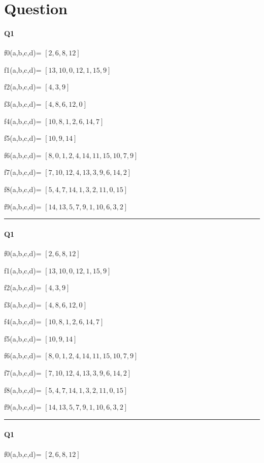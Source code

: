 
\section{Question}

\paragraph{Q1}


f0(a,b,c,d)= $[2, 6, 8, 12]$

f1(a,b,c,d)= $[13, 10, 0, 12, 1, 15, 9]$

f2(a,b,c,d)= $[4, 3, 9]$

f3(a,b,c,d)= $[4, 8, 6, 12, 0]$

f4(a,b,c,d)= $[10, 8, 1, 2, 6, 14, 7]$

f5(a,b,c,d)= $[10, 9, 14]$

f6(a,b,c,d)= $[8, 0, 1, 2, 4, 14, 11, 15, 10, 7, 9]$

f7(a,b,c,d)= $[7, 10, 12, 4, 13, 3, 9, 6, 14, 2]$

f8(a,b,c,d)= $[5, 4, 7, 14, 1, 3, 2, 11, 0, 15]$

f9(a,b,c,d)= $[14, 13, 5, 7, 9, 1, 10, 6, 3, 2]$


\hrule width 1\linewidth
\paragraph{Q1}


f0(a,b,c,d)= $[2, 6, 8, 12]$

f1(a,b,c,d)= $[13, 10, 0, 12, 1, 15, 9]$

f2(a,b,c,d)= $[4, 3, 9]$

f3(a,b,c,d)= $[4, 8, 6, 12, 0]$

f4(a,b,c,d)= $[10, 8, 1, 2, 6, 14, 7]$

f5(a,b,c,d)= $[10, 9, 14]$

f6(a,b,c,d)= $[8, 0, 1, 2, 4, 14, 11, 15, 10, 7, 9]$

f7(a,b,c,d)= $[7, 10, 12, 4, 13, 3, 9, 6, 14, 2]$

f8(a,b,c,d)= $[5, 4, 7, 14, 1, 3, 2, 11, 0, 15]$

f9(a,b,c,d)= $[14, 13, 5, 7, 9, 1, 10, 6, 3, 2]$


\hrule width 1\linewidth
\paragraph{Q1}


f0(a,b,c,d)= $[2, 6, 8, 12]$

